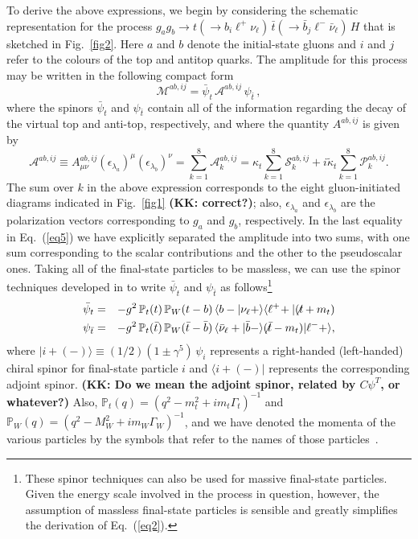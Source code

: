 \documentclass[aps,preprint,tightenlines,floatfix,superscriptaddress,nofootinbib,showpacs]{revtex4-1}
\def\beq{\begin{equation}}
\def\eeq{\end{equation}}
\def\bea{\begin{eqnarray}}
\def\eea{\end{eqnarray}}
\def\tbslash{\tbar\hspace{-10pt}\not{}\hspace{4pt}}
\def\tslash{t\hspace{-10pt}\not{}\hspace{4pt}}
\def\tbar{\bar{t}}
\def\bbar{\bar{b}}
\def\nubar{{\bar{\nu}}_{\ell}}
\def\kp{\kappa_t}
\def\kpt{\tilde{\kappa}_t}
\begin{document}
To derive the above expressions, we begin by considering the
schematic representation for the process $g_ag_b\to t(\to
b_i{\ell}^+\nu_{\ell})\,\tbar(\to \bbar_j {\ell}^- \nubar)\,H$
that is sketched in Fig.~\ref{fig2}.
Here $a$ and $b$ denote the initial-state gluons and
$i$ and $j$ refer to the colours of the top and antitop quarks.
%
The amplitude for this process may be written in the following
compact form
%
\beq
\label{eq6}
\mathcal{M}^{ab,ij}=\bar{\psi}_t\,\mathcal{A}^{ab,ij}\,\psi_{\tbar}\,,
\eeq
%
where the spinors $\bar{\psi}_t$ and $\psi_{\tbar}$
contain all of the information regarding the decay of the
virtual top and anti-top, respectively,
and where the quantity $A^{ab,ij}$ is given by
%
\beq
\label{eq5}
\mathcal{A}^{ab,ij}\equiv A^{ab,ij}_{\mu\nu}(\epsilon_{\lambda_a})^{\mu}(\epsilon_{\lambda_b})^{\nu}=\sum_{k=1}^8 \mathcal{A}^{ab,ij}_k =\kp \sum_{k=1}^8 \mathcal{S}^{ab,ij}_k + i\kpt \sum_{k=1}^8 \mathcal{P}^{ab,ij}_k.
\eeq 
%
The sum over $k$ in the above expression
corresponds to the eight gluon-initiated
diagrams indicated in Fig.~\ref{fig1} {\bf (KK: correct?)}; also,
$\epsilon_{\lambda_a}$ and $\epsilon_{\lambda_b}$ are the
polarization vectors corresponding to $g_a$ and $g_b$, respectively.
In the last equality in Eq.~(\ref{eq5})
we have explicitly separated the amplitude into
two sums, with one sum corresponding to the scalar contributions
and the other to the pseudoscalar ones.
Taking all of the final-state particles to be massless, we can use the
spinor techniques
developed in \cite{Kleiss} to write $\bar{\psi}_t$ and
$\psi_{\tbar}$ as follows\footnote{These spinor techniques can also be used
  for massive final-state particles. Given the
  energy scale involved in the process in question, however, the assumption
  of massless final-state particles is sensible and greatly
  simplifies the derivation of Eq.~(\ref{eq2}).}
%
\bea
\label{eq7}
\bar{\psi}_t &=& -g^2\, \mathbb{P}_t(t)\,\mathbb{P}_W(t-b)\,
   \langle b-|\nu_{\ell}+\rangle \langle {\ell}^+\!+|(\tslash+m_t)\\
\label{eq8}
\psi_{\tbar} &=& -g^2\, \mathbb{P}_t(\tbar)\,\mathbb{P}_W(\tbar-\bbar)\,
   \langle\nubar+|\bbar-\rangle (\tbslash-m_t)|{\ell}^-+\rangle,
\eea
%
where $|i+(-)\rangle \equiv (1/2)(1\pm \gamma^5)\,\psi_i$
represents a right-handed (left-handed) chiral spinor for final-state
particle $i$ and $\langle i+(-)|$ represents the corresponding adjoint spinor.
{\bf (KK: Do we mean the adjoint spinor, related by $C \psi^T$,
  or whatever?)}
Also, $\mathbb{P}_t(q)=(q^2-m^2_t+im_t\Gamma_t)^{-1}$ and
$\mathbb{P}_W(q)=(q^2-M^2_W+im_W\Gamma_W)^{-1}$, and
we have denoted the momenta of the various particles by the symbols
that refer to the names of those particles~\cite{Mangano}.
\end{document}
